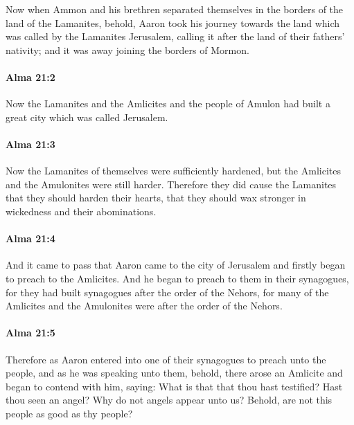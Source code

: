 			Now when Ammon and his brethren separated themselves
			in the borders of the land of the Lamanites,
			behold, Aaron took his journey towards the land
			which was called by the Lamanites Jerusalem,
			calling it after the land of their fathers' nativity;
			and it was away joining the borders of Mormon.

		\paragraph{Alma 21:2} %
			\label{ALMA-21-2}

			Now the Lamanites and the Amlicites and the people of Amulon
			had built a great city which was called Jerusalem.

		\paragraph{Alma 21:3} %
			\label{ALMA-21-3}

			Now the Lamanites of themselves were sufficiently hardened,
			but the Amlicites and the Amulonites were still harder.
			Therefore they did cause the Lamanites that they should harden their hearts,
			that they should wax stronger in wickedness and their abominations.

		\paragraph{Alma 21:4} %
			\label{ALMA-21-4}

			And it came to pass that Aaron came to the city of Jerusalem
			and firstly began to preach to the Amlicites.
			And he began to preach to them in their synagogues,
			for they had built synagogues after the order of the Nehors,
			for many of the Amlicites and the Amulonites were after the order of the Nehors.

		\paragraph{Alma 21:5} %
			\label{ALMA-21-5}

			Therefore as Aaron entered into one of their synagogues to preach unto the people,
			and as he was speaking unto them,
			behold, there arose an Amlicite and began to contend with him, saying:
			What is that that thou hast testified?
			Hast thou seen an angel?
			Why do not angels appear unto us?
			Behold, are not this people as good as thy people?

